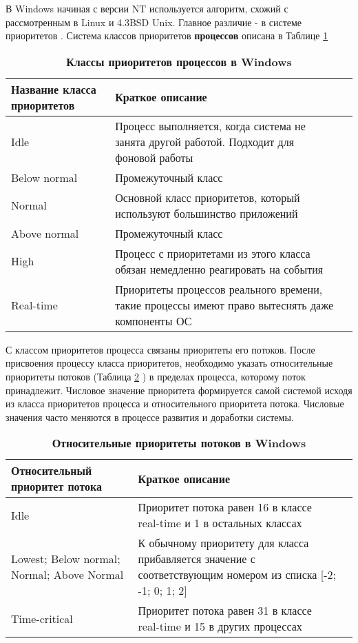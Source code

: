 В Windows начиная с версии NT используется алгоритм, схожий с рассмотренным в Linux и 4.3BSD Unix. Главное различие - в системе приоритетов \cite{rihter} \cite{hart} . Система классов приоритетов \textbf{процессов} описана в Таблице {\ref{Tables:WinPrior}} 

\begin{table}[H]
\begin{tabularx}{\textwidth}{|X|X|X|}
\hline
\textbf{Название класса приоритетов} & \textbf{Краткое описание}\\
\hline
Idle & Процесс выполняется, когда система не занята другой работой. Подходит для фоновой работы\\
\hline
Below normal & Промежуточный класс\\
\hline
Normal & Основной класс приоритетов, который используют большинство приложений\\
\hline
Above normal & Промежуточный класс\\
\hline
High & Процесс с приоритетами из этого класса обязан немедленно реагировать на события\\
\hline
Real-time & Приоритеты процессов реального времени, такие процессы имеют право вытеснять даже компоненты ОС\\
\hline
\end{tabularx}
\caption{\textbf{Классы приоритетов процессов в Windows}}
\label{Tables:WinPrior}
\end{table}

С классом приоритетов процесса связаны приоритеты его потоков. После присвоения процессу класса приоритетов, необходимо указать относительные приоритеты потоков (Таблица \ref{Tables:ThRelativePr} ) в пределах процесса, которому поток принадлежит. Числовое значение приоритета формируется самой системой исходя из класса приоритетов процесса и относительного приоритета потока. Числовые значения часто меняются в процессе развития и доработки системы.

\begin{table}[H]
\begin{tabularx}{\textwidth}{|X|X|X|}
\hline
\textbf{Относительный приоритет потока} & \textbf{Краткое описание}\\
\hline
Idle & Приоритет потока равен 16 в классе real-time и 1 в остальных классах\\
\hline
Lowest; Below normal; Normal; Above Normal&К обычному приоритету для класса прибавляется значение с соответствующим номером из списка [-2; -1; 0; 1; 2] \\
\hline
Time-critical& Приоритет потока равен 31 в классе real-time и 15 в других процессах\\
\hline
\end{tabularx}
\caption{\textbf{Относительные приоритеты потоков в Windows}}
\label{Tables:ThRelativePr}
\end{table}
